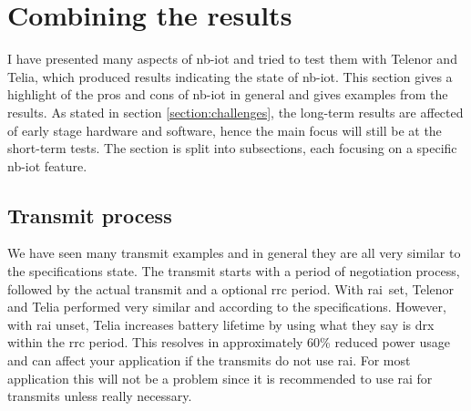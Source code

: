 \documentclass[USenglish]{ifimaster}  %
\begin{document}
\begin{table}[H]
\centering
{}
\caption{Long-term accumulated calculation}
\label{table:longtermcalculation}
\end{table}

\section{Combining the results}
I have presented many aspects of \acrshort{nb-iot} and tried to test them with Telenor and Telia, which produced results indicating the state of \acrshort{nb-iot}. This section gives a highlight of the pros and cons of \acrshort{nb-iot} in general and gives examples from the results. As stated in section \vref{section:challenges}, the long-term results are affected of early stage hardware and software, hence the main focus will still be at the short-term tests. The section is split into subsections, each focusing on a specific \acrshort{nb-iot} feature.

\subsection{Transmit process}
We have seen many transmit examples and in general they are all very similar to the specifications state. The transmit starts with a period of negotiation process, followed by the actual transmit and a optional \acrshort{rrc} period. With \acrshort{rai} set, Telenor and Telia performed very similar and according to the specifications. However, with \acrshort{rai} unset, Telia increases battery lifetime by using what they say is \acrshort{drx} within the \acrshort{rrc} period. This resolves in approximately 60\% reduced power usage and can affect your application if the transmits do not use \acrshort{rai}. For most application this will not be a problem since it is recommended to use \acrshort{rai} for transmits unless really necessary.
\end{document}
